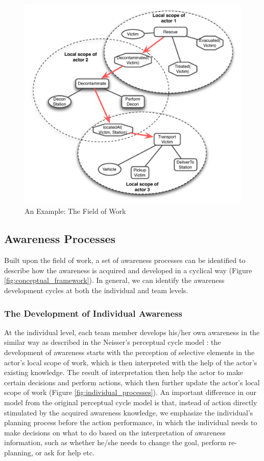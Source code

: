 \begin{figure}[htbp] %
   \centering
   \includegraphics[width=4.5in]{field_of_work_example.pdf} 
   \caption{An Example: The Field of Work}
   \label{fig:field_of_work_example}
\end{figure}

\subsection{Awareness Processes} %
\label{sub:awareness_processes}
Built upon the field of work, a set of awareness processes can be identified to describe how the awareness is acquired and developed in a cyclical way (Figure \ref{fig:conceptual_framework}). In general, we can identify the awareness development cycles at both the individual and team levels.

\subsubsection{The Development of Individual Awareness} %
\label{ssub:individual_processes}
At the individual level, each team member develops his/her own awareness in the similar way as described in the Neisser's perceptual cycle model \cite{neisser1976cognition}: the development of awareness starts with the perception of selective elements in the actor's local scope of work, which is then interpreted with the help of the actor's existing knowledge. The result of interpretation then help the actor to make certain decisions and perform actions, which then further update the actor's local scope of work (Figure \ref{fig:individual_processes}). An important difference in our model from the original perceptual cycle model is that, instead of action directly stimulated by the acquired awareness knowledge, we emphasize the individual's planning process before the action performance, in which the individual needs to make decisions on what to do based on the interpretation of awareness information, such as whether he/she needs to change the goal, perform re-planning, or ask for help etc.


